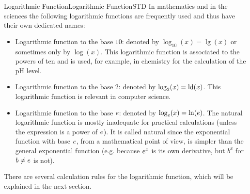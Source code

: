 \begin{MXContent}{Logarithmic Function}{Logarithmic Function}{STD}
In mathematics and in the sciences the following logarithmic functions are frequently used and 
thus have their own dedicated names:
\begin{itemize}
\item{Logarithmic function to the base $10$: denoted by $\log_{10}(x)=\lg(x)$ or sometimes only by $\log(x)$. This 
logarithmic function is associated to the powers of ten and is used, for example, in chemistry for the calculation of 
the pH level.}
\item{Logarithmic function to the base $2$: denoted by $\log_2(x)=\operatorname{ld}(x)$. This 
logarithmic function is relevant in computer science.}
\item{Logarithmic function to the base $e$: denoted by $\log_e(x)=\ln(e)$. The natural logarithmic function
is mostly inadequate for practical calculations (unless the expression is a power of $e$). It is called 
natural since the exponential function with base $e$, from a mathematical point of view, is simpler than 
the general exponential function (e.g. because $e^x$ is its own derivative, but $b^x$ for $b\not=e$ is not).}
\end{itemize}

There are several calculation rules for the logarithmic function, which will be explained in the next section.
\end{MXContent}

